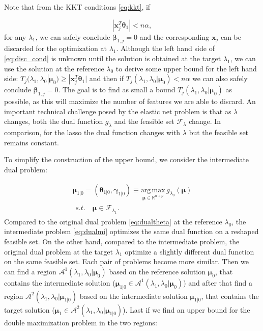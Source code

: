 Note that from the KKT conditions \eqref{eq:kkt}, if

\begin{equation}
    \label{eq:disc_cond}
    |\boldsymbol x_j^T\boldsymbol\theta_{1}|<n\alpha,
\end{equation}
for any $\lambda_1$, we can safely conclude $\boldsymbol\beta_{1,j}=0$ and the corresponding $\boldsymbol x_j$ can be discarded for the optimization at $\lambda_1$. Although the left hand side of \eqref{eq:disc_cond} is unknown until the solution is obtained at the target $\lambda_1$, we can use the solution at the reference $\lambda_{0}$ to derive some upper bound for the left hand side: $T_j(\lambda_{1},\lambda_{0}|\boldsymbol\mu_0)\geq |\boldsymbol x_j^T\boldsymbol\theta_1|$ and then if $T_j(\lambda_{1},\lambda_{0}|\boldsymbol\mu_0)<n\alpha$ we can also safely conclude $\boldsymbol\beta_{1,j}=0$. The goal is to find as small a bound $T_j(\lambda_{1},\lambda_{0}|\boldsymbol\mu_0)$ as possible, as this will maximize the number of features we are able to discard. An important technical challenge posed by the elastic net problem is that as $\lambda$ changes, both the dual function $g_\lambda$ and the feasible set $\mathcal{F}_\lambda$ change. In comparison, for the lasso the dual function changes with $\lambda$ but the feasible set remains constant.

To simplify the construction of the upper bound, we consider the intermediate dual problem:

\begin{gather}
        \label{eq:dualmi}
        \boldsymbol\mu_{1|0}=(\boldsymbol\theta_{1|0},\boldsymbol\gamma_{1|0})\equiv\underset{\boldsymbol\mu\in \mathbb{R}^{ n+p}}{\mathrm{arg\,max}}\,g_{\lambda_0}(\boldsymbol\mu)\\
        \begin{aligned}s.t.\quad \boldsymbol\mu\in \mathcal{F}_{\lambda_1}\nonumber.
        \end{aligned}
\end{gather}
Compared to the original dual problem \eqref{eq:dualtheta} at the reference $\lambda_0$, the intermediate problem \eqref{eq:dualmi} optimizes the same dual function on a reshaped feasible set. On the other hand, compared to the intermediate problem, the original dual problem at the target $\lambda_1$ optimize a slightly different dual function on the same feasible set. Each pair of problems become more similar. Then we can find a region $\mathcal{A}^1(\lambda_1,\lambda_0|\boldsymbol\mu_0)$ based on the reference solution $\boldsymbol\mu_0$, that contains the intermediate solution ($\boldsymbol\mu_{1|0}\in \mathcal{A}^1(\lambda_1,\lambda_0|\boldsymbol\mu_0)$) and after that find a region $\mathcal{A}^2(\lambda_1,\lambda_0|\boldsymbol\mu_{1|0})$ based on the intermediate solution $\boldsymbol\mu_{1|0}$, that contains the target solution  ($\boldsymbol\mu_1\in \mathcal{A}^2(\lambda_1,\lambda_0|\boldsymbol\mu_{1|0})$). Last if we find an upper bound for the double maximization problem in the two regions:

